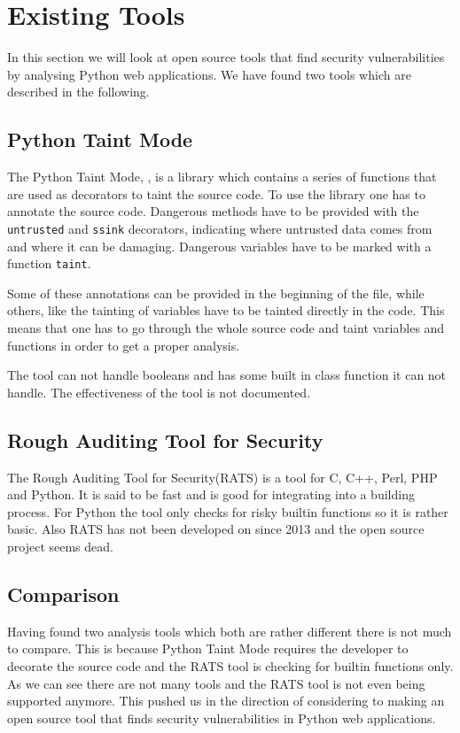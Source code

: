 \section{Existing Tools}
In this section we will look at open source tools that find security vulnerabilities by analysing Python web applications.
We have found two tools which are described in the following.

\subsection{Python Taint Mode}
The Python Taint Mode, \citet{conti2010taint}, is a library which contains a series of functions that are used as decorators to taint the source code.
To use the library one has to annotate the source code.
Dangerous methods have to be provided with the \texttt{untrusted} and \texttt{ssink} decorators, indicating where untrusted data comes from and where it can be damaging.
Dangerous variables have to be marked with a function \texttt{taint}.

Some of these annotations can be provided in the beginning of the file, while others, like the tainting of variables have to be tainted directly in the code.
This means that one has to go through the whole source code and taint variables and functions in order to get a proper analysis.

The tool can not handle booleans and has some built in class function it can not handle.
The effectiveness of the tool is not documented.

\subsection{Rough Auditing Tool for Security}
The Rough Auditing Tool for Security(RATS)\cite{rats} is a tool for C, C++, Perl, PHP and Python.
It is said to be fast and is good for integrating into a building process.
For Python the tool only checks for risky builtin functions so it is rather basic.
Also RATS has not been developed on since 2013 and the open source project seems dead.

\subsection{Comparison}
Having found two analysis tools which both are rather different there is not much to compare.
This is because Python Taint Mode requires the developer to decorate the source code and the RATS tool is checking for builtin functions only.
As we can see there are not many tools and the RATS tool is not even being supported anymore.
This pushed us in the direction of considering to making an open source tool that finds security vulnerabilities in Python web applications.
